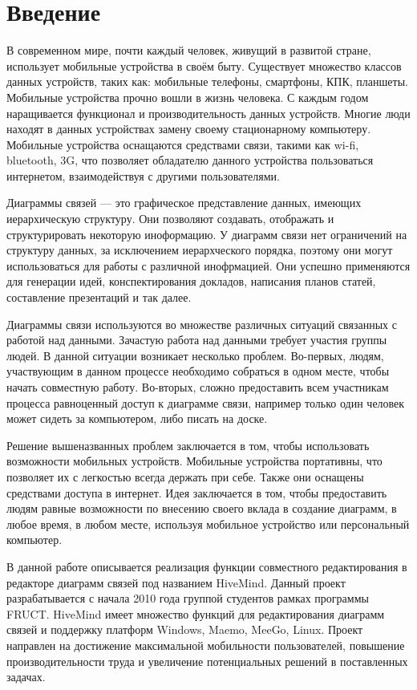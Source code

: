 \newpage

\chapter*{Введение}
\label{chap:introduction}

В современном мире, почти каждый человек, живущий в развитой стране, использует
мобильные устройства в своём быту. Существует множество классов данных
устройств, таких как: мобильные телефоны, смартфоны, КПК, планшеты. Мобильные
устройства прочно вошли в жизнь человека. С каждым годом наращивается функционал
и производительность данных устройств. Многие люди находят в данных устройствах
замену своему стационарному компьютеру. Мобильные устройства оснащаются
средствами связи, такими как wi-fi, bluetooth, 3G, что позволяет обладателю
данного устройства пользоваться интернетом, взаимодействуя с другими
пользователями.

Диаграммы связей --- это графическое представление данных, имеющих
иерархическую структуру. Они позволяют создавать, отображать и
структурировать некоторую иноформацию. У диаграмм связи нет ограничений на
структуру данных, за исключением иерархческого порядка, поэтому они могут
использоваться для работы с различной инофрмацией. Они успешно
применяются для генерации идей, конспектирования докладов, написания планов
статей, составление презентаций и так далее.

Диаграммы связи используются во множестве различных ситуаций связанных с работой
над данными. Зачастую работа над данными требует участия группы людей. В данной
ситуации возникает несколько проблем. Во-первых, людям, участвующим в данном
процессе необходимо собраться в одном месте, чтобы начать совместную работу.
Во-вторых, сложно предоставить всем участникам процесса равноценный доступ к
диаграмме связи, например только один человек может сидеть за компьютером, либо
писать на доске.

Решение вышеназванных проблем заключается в том, чтобы использовать возможности
мобильных устройств. Мобильные устройства портативны, что позволяет их с
легкостью всегда держать при себе. Также они оснащены средствами доступа в
интернет. Идея заключается в том, чтобы предоставить людям равные возможности по
внесению своего вклада в создание диаграмм, в любое время, в любом месте,
используя мобильное устройство или персональный компьютер.

В данной работе описывается реализация функции совместного редактирования в
редакторе диаграмм связей под названием HiveMind. Данный проект разрабатывается
с начала 2010 года группой студентов рамках программы FRUCT. HiveMind имеет
множество функций для редактирования диаграмм связей и поддержку платформ
Windows, Maemo, MeeGo, Linux. Проект направлен на достижение максимальной
мобильности пользователей, повышение производительности труда и увеличение
потенциальных решений в поставленных задачах.

